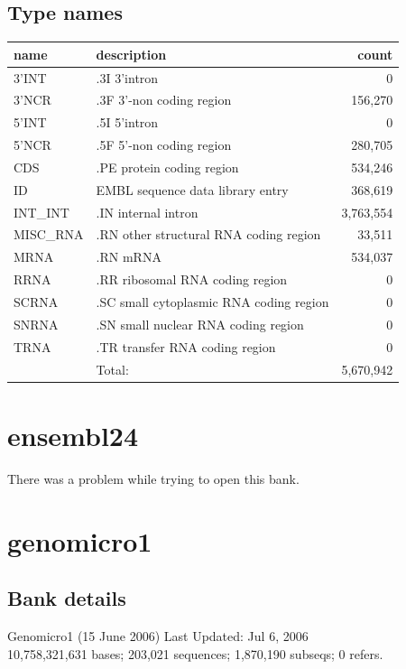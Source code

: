 \documentclass{article}
\begin{document}
\begin{Schunk}
\subsection{Type names}
\noindent\begin{tabular}{llr}
\hline \hline
name & description & count \\
\hline
3'INT  &  .3I 3'intron  &  0 \\
3'NCR  &  .3F  3'-non coding region  &  156,270 \\
5'INT  &  .5I 5'intron  &  0 \\
5'NCR  &  .5F  5'-non coding region  &  280,705 \\
CDS  &  .PE protein coding region  &  534,246 \\
ID  &  EMBL sequence data library entry  &  368,619 \\
INT\_INT  &  .IN  internal intron  &  3,763,554 \\
MISC\_RNA  &  .RN other structural RNA coding region  &  33,511 \\
MRNA  &  .RN mRNA  &  534,037 \\
RRNA  &  .RR ribosomal RNA coding region  &  0 \\
SCRNA  &  .SC small cytoplasmic RNA coding region  &  0 \\
SNRNA  &  .SN small nuclear RNA coding region  &  0 \\
TRNA  &  .TR transfer RNA coding region  &  0 \\
\hline
 & Total: & 5,670,942 \\
\hline \hline
\end{tabular}

\section{ ensembl24 }
There was a problem while trying to open this bank.
\section{ genomicro1 }
\subsection{Bank details}
Genomicro1 (15 June 2006) Last Updated: Jul  6, 2006\\
10,758,321,631 bases; 203,021 sequences; 1,870,190 subseqs; 0 refers.\\
\\
\\



\end{Schunk}
\end{document}

